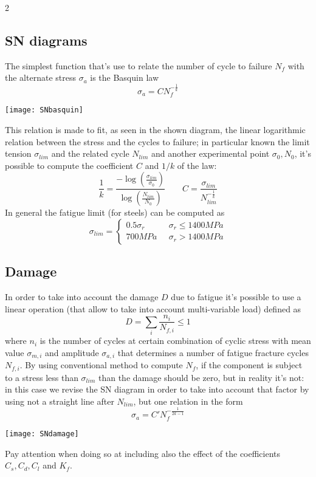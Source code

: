 \begin{multicols} 2
\subsection*{SN diagrams}
	The simplest function that's use to relate the number of cycle to failure $N_f$ with the alternate stress $\sigma_a$ is the Basquin law
	\begin{equation}
		\sigma_a = C N_f ^{-\frac 1 k}
	\end{equation}
	\begin{center}
		\texttt{[image: SNbasquin]}
	\end{center}
	
	This relation is made to fit, as seen in the shown diagram, the linear logarithmic relation between the stress and the cycles to failure; in particular known the limit tension $\sigma_{lim}$ and the related cycle $N_{lim}$ and another experimental point $\sigma_0, N_0$, it's possible to compute the coefficient $C$ and $1/k$ of the law:
	\[ \frac 1 k = \frac{-\log \left( \frac{\sigma_{lim}}{\sigma_0} \right) }{\log \left( \frac{N_{lim}}{N_0} \right)}  \qquad C = \frac{\sigma_{lim}}{N_{lim}^{-\frac 1 k}} \]
	In general the fatigue limit (for steels) can be computed as
	\[ \sigma_{lim} = \begin{cases}
		0.5 \sigma_r \qquad & \sigma_r \leq 1400MPa \\
		700 MPa & \sigma_r>1400MPa
	\end{cases}  \]

\subsection*{Damage}
	In order to take into account the damage $D$ due to fatigue it's possible to use a linear operation (that allow to take into account multi-variable load) defined as
	\[ D = \sum_i \frac{n_i}{N_{f,i}} \leq 1 \]
	where $n_i$ is the number of cycles at certain combination of cyclic stress with mean value $\sigma_{m,i}$ and amplitude $\sigma_{a,i}$ that determines a number of fatigue fracture cycles $N_{f,i}$. By using conventional method to compute $N_f$, if the component is subject to a stress less than $\sigma_{lim}$ than the damage should be zero, but in reality it's not: in this case we revise the SN diagram in order to take into account that factor by using not a straight line after $N_{lim}$, but one relation in the form
	\[ \sigma_a = C'N_f^{-\frac{1}{2k-1}} \]
	\begin{center}
		\texttt{[image: SNdamage]}
	\end{center}
	Pay attention when doing so at including also the effect of the coefficients $C_s,C_d,C_l$ and $K_f$.



\end{multicols}







